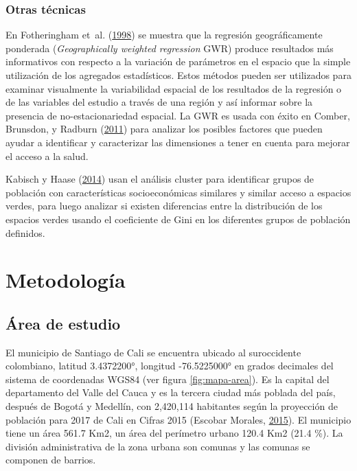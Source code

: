 \documentclass[12pt,a4paper,oneside, openany]{book}
\theoremstyle{definition}
\theoremstyle{definition}
\theoremstyle{definition}
\theoremstyle{remark}
\begin{document}
\subsection{Otras técnicas}\label{otras-tuxe9cnicas}

En Fotheringham et~al.
(\protect\hyperlink{ref-fotheringham_geographically_1998}{1998}) se
muestra que la regresión geográficamente ponderada (\emph{Geographically
weighted regression} GWR) produce resultados más informativos con
respecto a la variación de parámetros en el espacio que la simple
utilización de los agregados estadísticos. Estos métodos pueden ser
utilizados para examinar visualmente la variabilidad espacial de los
resultados de la regresión o de las variables del estudio a través de
una región y así informar sobre la presencia de no-estacionariedad
espacial. La GWR es usada con éxito en Comber, Brunsdon, y Radburn
(\protect\hyperlink{ref-comber_spatial_2011}{2011}) para analizar los
posibles factores que pueden ayudar a identificar y caracterizar las
dimensiones a tener en cuenta para mejorar el acceso a la salud.

Kabisch y Haase (\protect\hyperlink{ref-kabisch_green_2014}{2014}) usan
el análisis cluster para identificar grupos de población con
características socioeconómicas similares y similar acceso a espacios
verdes, para luego analizar si existen diferencias entre la distribución
de los espacios verdes usando el coeficiente de Gini en los diferentes
grupos de población definidos.

\chapter{Metodología}\label{meto}

\section{Área de estudio}\label{uxe1rea-de-estudio}

El municipio de Santiago de Cali se encuentra ubicado al suroccidente
colombiano, latitud 3.4372200°, longitud -76.5225000° en grados
decimales del sistema de coordenadas WGS84 (ver figura
\ref{fig:mapa-area}). Es la capital del departamento del Valle del Cauca
y es la tercera ciudad más poblada del país, después de Bogotá y
Medellín, con 2,420,114 habitantes según la proyección de población para
2017 de Cali en Cifras 2015 (Escobar Morales,
\protect\hyperlink{ref-escobar2015cali}{2015}). El municipio tiene un
área 561.7 Km2, un área del perímetro urbano 120.4 Km2 (21.4 \%). La
división administrativa de la zona urbana son comunas y las comunas se
componen de barrios.
\end{document}
